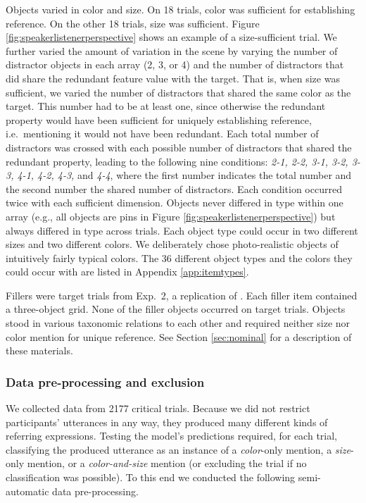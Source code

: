 \documentclass[11pt]{article}
\newcommand{\figref}[1]{Figure \ref{#1}}
\newcommand{\appref}[1]{Appendix \ref{#1}}
\newcommand{\sectionref}[1]{Section \ref{#1}}
\begin{document}
Objects varied in color and size. On 18 trials, color was sufficient for establishing reference. On the other 18 trials, size was sufficient. \figref{fig:speakerlistenerperspective} shows an example of a size-sufficient trial. We further varied the amount of variation in the scene by varying the number of distractor objects in each array (2, 3, or  4) and the number of distractors that did share the redundant feature value with the target. That is, when size was sufficient, we varied the number of distractors that shared the same color as the target. This number had to be at least one, since otherwise the redundant property would have been sufficient for uniquely establishing reference, i.e.~mentioning it would not have been redundant. Each total number of distractors was crossed with each possible number of distractors that shared the redundant property, leading to the following nine conditions: \emph{2-1, 2-2, 3-1, 3-2, 3-3, 4-1, 4-2, 4-3,} and \emph{4-4}, where the first number indicates the total number and the second number the shared number of distractors. Each condition occurred twice with each sufficient dimension. Objects never differed in type within one array (e.g., all objects are pins in \figref{fig:speakerlistenerperspective}) but always differed in type across trials. Each object type could occur in two different sizes and two different colors. We deliberately chose photo-realistic objects of intuitively fairly typical colors. The 36 different object types and the colors they could occur with are listed in \appref{app:itemtypes}. 


Fillers were target trials from Exp.~2, a replication of . Each filler item contained a three-object grid. None of the filler objects occurred on target trials. Objects stood in various taxonomic relations to each other and required neither size nor color mention for unique reference. See \sectionref{sec:nominal} for a description of these materials.

\subsubsection{Data pre-processing and exclusion}

We collected data from 2177 critical trials. Because we did not restrict participants' utterances in any way, they produced many different kinds of referring expressions. Testing the model's predictions required, for each trial, classifying the produced utterance as an instance of a \emph{color}-only mention, a \emph{size}-only mention, or a \emph{color-and-size} mention (or excluding the trial if no classification was possible). To this end we conducted the following semi-automatic data pre-processing. 
\end{document}
